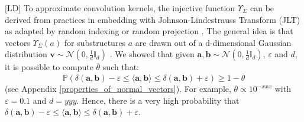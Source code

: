 \documentclass[twoside,11pt]{article}
\def\vec#1{\mathbf{#1}}
\def\smallvectors#1{\mathcal{#1}}
\def\R{\mathbb{R}}
\def\P{\mathbb{P}}
\def\dotprod#1#2{\langle#1,#2\rangle}
\def\df{\Upsilon}
\newcounter{properties}
\def\LD#1{[{\color{blue}L}D] {\color{blue}#1}}
\begin{document}
\LD{To approximate convolution kernels, the injective function $\df_{\Sigma}$  can be derived from practices in embedding with Johnson-Lindestrauss Transform (JLT) \cite{JLL} as adapted by random indexing \cite{random_indexing} or random projection \cite{random_projection}.} The general idea is that vectors  $\df_{\Sigma}(a)$ for substructures $a$ are drawn out of a d-dimensional Gaussian distribution $\vec v\sim \mathcal{N}(0,\frac{1}{d}\mathbb{I}_d)$ \cite{Indyk:1998:ANN:276698.276876,JLLsimple_demonstration}. 
We showed that given $\vec{a},\vec{b} \sim \mathcal{N}(0,\frac{1}{d}\mathbb{I}_d)$, $\varepsilon$ and $d$,  it is possible to compute $\overline{\theta}$ such that:
\begin{equation}
\P(\delta(\vec{a},\vec{b}) - \varepsilon \leq \dotprod{\vec{a}}{\vec{b}} \leq \delta(\vec{a},\vec{b}) + \varepsilon) \geq 1- \overline{\theta}
\label{eq:probs}
\end{equation}
(see Appendix \ref{properties_of_normal_vectors}).
For example, $\overline{\theta} \propto 10^{-xxx}$ with $\varepsilon = 0.1$ and $d=yyy$. Hence, there is a very high probability that $\delta(\vec{a},\vec{b}) - \varepsilon \leq \dotprod{\vec{a}}{\vec{b}} \leq \delta(\vec{a},\vec{b}) + \varepsilon$.

\end{document}
